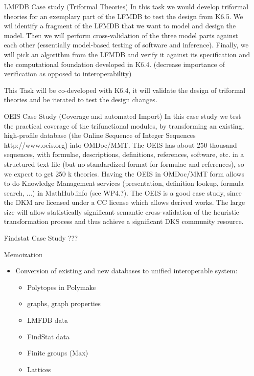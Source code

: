 \begin{Workpackage}{\thewpno}
\begin{task}{LMFDB Case study (Triformal Theories)}
\label{task:data_LMFDB}
In this task we would develop triformal theories for an exemplary part of the LFMDB to test the design from K6.5.  We wil identify a fragment of the LFMDB that we want to model and design the model. Then we will perform cross-validation of the three model parts against each other (essentially model-based testing of software and inference). Finally, we will pick an algorithm from the LFMDB and verify it against its specification and the computational foundation developed in K6.4. (decrease importance of verification as opposed to interoperability)

This Task will be co-developed with K6.4, it will validate the design of triformal theories and be iterated to test the design changes.
\end{task}


\begin{task}{OEIS Case Study (Coverage and automated Import)}
\label{task:data_OEIS}
In this case study we test the practical coverage of the trifunctional modules, by transforming an existing, high-profile database (the Online Sequence of Integer Sequences http://www.oeis.org) into OMDoc/MMT. The OEIS has about 250 thousand sequences, with formulae, descriptions, definitions, references, software, etc. in a structured text file (but no standardized format for formulae and references), so we expect to get 250 k theories. Having the OEIS in OMDoc/MMT form allows to do Knowledge Management services (presentation, definition lookup, formula search, ...) in MathHub.info (see WP4.?). The OEIS is a good case study, since the DKM  are licensed under a CC license which allows derived works. The large size will allow statistically significant semantic cross-validation of the heuristic transformation process and thus achieve a significant DKS community resource.
\end{task}

\begin{task}{Findstat Case Study ???}
\label{task:data_findstat}

\end{task}

\begin{task}{Memoization}
\label{task:data_memo}

\end{task}

\begin{WPDeliverables}
\begin{itemize}
\item Conversion of existing and new databases to unified interoperable system:
  \begin{itemize}
  \item Polytopes in Polymake
  \item graphs, graph properties
  \item LMFDB data
  \item FindStat data
  \item Finite groups (Max)
  \item Lattices
  \end{itemize}
  

\end{itemize}
\end{WPDeliverables}
\end{Workpackage}
